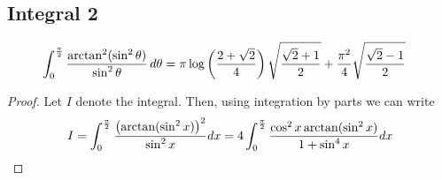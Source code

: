 \subsection{Integral 2}
\begin{align*}
\int_0^{\pi\over 2} \frac{\arctan^2 (\sin^2 \theta)}{\sin^2 \theta}\, d\theta &= \pi \log\left( \frac{2+\sqrt{2}}{4}\right) \sqrt{\frac{\sqrt{2}+1}{2}}+\frac{\pi^2}{4}\sqrt{\frac{\sqrt{2}-1}{2}}
\end{align*}
\begin{proof}
Let $I$ denote the integral. Then, using integration by parts we can write
\begin{align*} I=\int_{0}^{\pi\over 2}\frac{\left(\arctan(\sin^2 x) \right)^2}{\sin^2 x}dx = 4\int_0^{\frac{\pi}{2}}\frac{\cos^2 x\arctan(\sin^2 x)}{1+\sin^4 x}dx \end{align*}


\end{proof}
